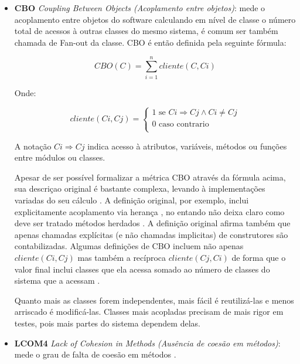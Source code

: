 \begin{itemize}

  \item {\bf CBO} {\it Coupling Between Objects (Acoplamento entre objetos)}:
    mede o acoplamento entre objetos do software \cite{Chidamber1994}
    calculando em nível de classe o número total de acessos à outras classes do
    mesmo sistema, é comum ser também chamada de Fan-out da classe. CBO é então
    definida pela seguinte fórmula:

\begin{equation}
\label{formula-cbo}
CBO(C) = \sum_{i=1}^{n} cliente(C, Ci)
\end{equation}

Onde:

\begin{equation}
cliente(Ci, Cj) =
  \begin{cases}
    1 \text{ se } Ci \Rightarrow Cj \wedge Ci \neq Cj \\
    0 \text{ caso contrario} \\
  \end{cases}
\end{equation}

A notação $ Ci \Rightarrow Cj $ indica acesso à atributos, variáveis, métodos ou funções
entre módulos ou classes.

Apesar de ser possível formalizar a métrica CBO através da fórmula acima, sua descriçao original é
bastante complexa, levando à implementações variadas do seu cálculo
\cite{Lincke2008}. A definição original, por exemplo, inclui explicitamente
acoplamento via herança \cite{Harrison1998}, no entando não deixa claro como
deve ser tratado métodos herdados \cite{Briand1999}. A definição original
afirma também que apenas chamadas explícitas (e não chamadas implicitas) de
construtores são contabilizadas. Algumas definições de CBO incluem não apenas $
cliente(Ci, Cj) $ mas também a recíproca $ cliente(Cj, Ci) $ de forma que o valor
final inclui classes que ela acessa somado ao número de classes do sistema que
a acessam \cite{Sant2008}.

Quanto mais as classes forem independentes, mais fácil é reutilizá-las e menos
arriscado é modificá-las. Classes mais acopladas precisam de mais rigor em
testes, pois mais partes do sistema dependem delas.

  \item {\bf LCOM4} {\it Lack of Cohesion in Methods (Ausência de coesão em
    métodos)}: mede o grau de falta de coesão em métodos \cite{Hitz1995}.


\end{itemize}
